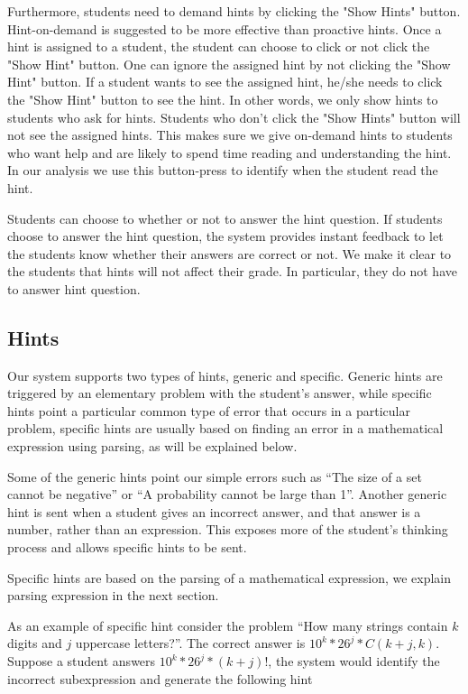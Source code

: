 \documentclass{sigchi}
\begin{document}
Furthermore, students need to demand hints by clicking the "Show
Hints" button. Hint-on-demand is suggested to be more effective than
proactive hints\cite{Razzaq2010}. Once a hint is assigned to a
student, the student can choose to click or not click the "Show Hint"
button. One can ignore the assigned hint by not clicking the "Show
Hint" button. If a student wants to see the assigned hint, he/she
needs to click the "Show Hint" button to see the hint. In other words,
we only show hints to students who ask for hints. Students who don't
click the "Show Hints" button will not see the assigned hints. This
makes sure we give on-demand hints to students who want help and are
likely to spend time reading and understanding the hint.  In our
analysis we use this button-press to identify when the student read
the hint.

Students can choose to whether or not to answer the hint question. If
students choose to answer the hint question, the system provides
instant feedback to let the students know whether their answers are
correct or not. We make it clear to the students that hints will not
affect their grade. In particular, they do not have to answer hint
question.

\subsection*{Hints}

Our system supports two types of hints, generic and specific. Generic hints
are triggered by an elementary problem with the student's answer, while specific
hints point a particular common type of error that occurs in a
particular problem, specific hints are usually based on finding an
error in a mathematical expression using parsing, as will be explained below.

Some of the generic hints point our simple errors such as ``The size
of a set cannot be negative'' or ``A probability cannot be large than
1''.   Another generic hint is sent when a student gives an incorrect answer,
and that answer is a number, rather than an expression. This exposes
more of the student's thinking process and allows specific hints to be sent.

Specific hints are based on the parsing of a mathematical expression,
we explain parsing expression in the next section.

As an example of specific hint consider the problem ``How many strings
contain $k$ digits and $j$ uppercase letters?''. The correct answer is
$10^k*26^j*C(k+j,k)$. Suppose a student answers $10^k*26^j*(k+j)!$,
the system would identify the incorrect subexpression and generate the
following hint
\end{document}
